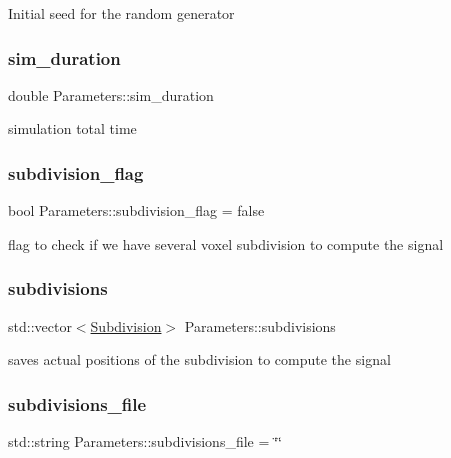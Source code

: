 Initial seed for the random generator \mbox{\label{class_parameters_acbe36f055786ddcf8480a49d2c34c914}} 
\subsubsection{\texorpdfstring{sim\+\_\+duration}{sim\_duration}}
{\footnotesize\ttfamily double Parameters\+::sim\+\_\+duration}

simulation total time \mbox{\label{class_parameters_a43362cb6e3ea49cc9db9e52c3ebc7140}} 
\subsubsection{\texorpdfstring{subdivision\+\_\+flag}{subdivision\_flag}}
{\footnotesize\ttfamily bool Parameters\+::subdivision\+\_\+flag = false}

flag to check if we have several voxel subdivision to compute the signal \mbox{\label{class_parameters_a3c05ff7a30f151c384b83ce3adca26fa}} 
\subsubsection{\texorpdfstring{subdivisions}{subdivisions}}
{\footnotesize\ttfamily std\+::vector$<$\hyperlink{class_subdivision}{Subdivision}$>$ Parameters\+::subdivisions}

saves actual positions of the subdivision to compute the signal \mbox{\label{class_parameters_a1733bfcb8391c494b7b1a317dfda5e44}} 
\subsubsection{\texorpdfstring{subdivisions\+\_\+file}{subdivisions\_file}}
{\footnotesize\ttfamily std\+::string Parameters\+::subdivisions\+\_\+file = \char`\"{}\char`\"{}}


